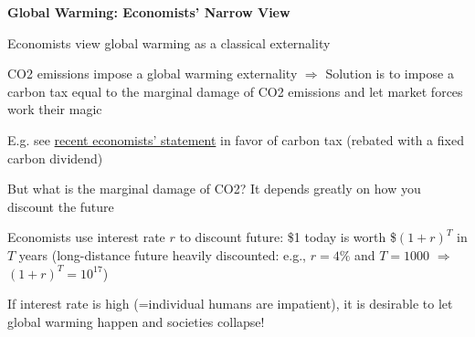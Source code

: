 \documentclass[landscape]{slides}
\begin{document}
\begin{slide}

\end{slide}




%
%
%
%


\begin{slide}
\begin{center}
{\bf Global Warming:  Economists' Narrow View}
\end{center}
Economists view global warming as a classical externality

CO2 emissions impose a global warming externality $\Rightarrow$ Solution is to impose a carbon tax
equal to the marginal damage of CO2 emissions and let market forces work their magic

E.g. see \href{https://www.econstatement.org}{recent economists' statement} in favor of carbon
tax (rebated with a fixed carbon dividend)

But what is the marginal damage of CO2? It depends greatly on how you discount the future

\normalsize
Economists use interest rate $r$ to discount future: \$1 today is worth \$$(1+r)^T$ in $T$ years
(long-distance future heavily discounted: e.g., $r=4\%$ and $T=1000$ $\Rightarrow$ $(1+r)^T=10^{17}$)

If interest rate is high (=individual humans are impatient), it is desirable to let global warming happen and societies collapse!

\end{slide}
\end{document}
